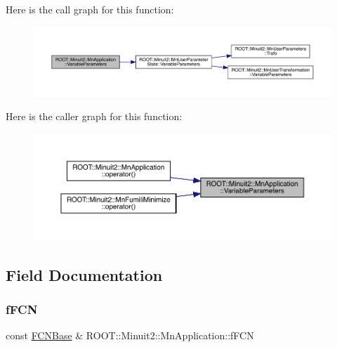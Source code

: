 Here is the call graph for this function\+:\nopagebreak
\begin{figure}[H]
\begin{center}
\leavevmode
\includegraphics[width=350pt]{df/dd5/classROOT_1_1Minuit2_1_1MnApplication_afc0ad887758b1609cbcae1c8b6a5a467_cgraph}
\end{center}
\end{figure}
Here is the caller graph for this function\+:\nopagebreak
\begin{figure}[H]
\begin{center}
\leavevmode
\includegraphics[width=350pt]{df/dd5/classROOT_1_1Minuit2_1_1MnApplication_afc0ad887758b1609cbcae1c8b6a5a467_icgraph}
\end{center}
\end{figure}


\subsection{Field Documentation}
\mbox{\label{classROOT_1_1Minuit2_1_1MnApplication_a3ea713844ff160f58da7e7d7897769fa}} 
\subsubsection{\texorpdfstring{fFCN}{fFCN}}
{\footnotesize\ttfamily const \mbox{\hyperlink{classROOT_1_1Minuit2_1_1FCNBase}{F\+C\+N\+Base}} \& R\+O\+O\+T\+::\+Minuit2\+::\+Mn\+Application\+::f\+F\+CN\hspace{0.3cm}{\ttfamily [protected]}}

